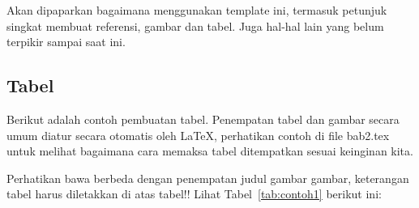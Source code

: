 Akan dipaparkan bagaimana menggunakan template ini, termasuk petunjuk singkat membuat referensi, gambar dan tabel.
Juga hal-hal lain yang belum terpikir sampai saat ini. 
 

\subsection{Tabel}  
Berikut adalah contoh pembuatan tabel. 
Penempatan tabel dan gambar secara umum diatur secara otomatis oleh \LaTeX{}, perhatikan contoh di file bab2.tex untuk melihat bagaimana cara memaksa tabel ditempatkan sesuai keinginan kita.

Perhatikan bawa berbeda dengan penempatan judul gambar gambar, keterangan tabel harus diletakkan di atas tabel!!
Lihat Tabel~\ref{tab:contoh1} berikut ini:

